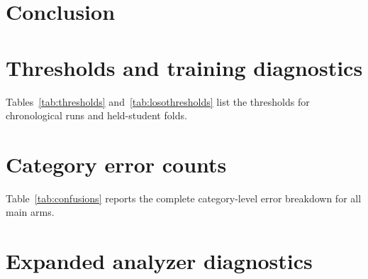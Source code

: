 \documentclass[11pt]{article}
\begin{document}
\section{Conclusion}


\appendix
\section{Thresholds and training diagnostics}
Tables~\ref{tab:thresholds} and~\ref{tab:losothresholds} list the thresholds for chronological runs and held-student folds.

\section{Category error counts}
Table~\ref{tab:confusions} reports the complete category-level error breakdown for all main arms.

\section{Expanded analyzer diagnostics}

\clearpage

\end{document}
